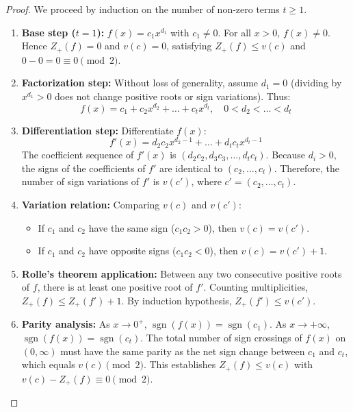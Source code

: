 \documentclass[11pt,a4paper]{article}
\theoremstyle{definition}
\begin{document}
\begin{proof}
We proceed by induction on the number of non-zero terms $t \ge 1$.
\begin{enumerate}
    \item \textbf{Base step ($t = 1$):} $f(x) = c_1 x^{d_1}$ with $c_1 \ne 0$. For all $x > 0$, $f(x) \ne 0$. Hence $Z_+(f) = 0$ and $v(c) = 0$, satisfying $Z_+(f) \le v(c)$ and $0 - 0 = 0 \equiv 0 \pmod 2$.
    
    \item \textbf{Factorization step:} Without loss of generality, assume $d_1 = 0$ (dividing by $x^{d_1} > 0$ does not change positive roots or sign variations). Thus:
    \[ f(x) = c_1 + c_2 x^{d_2} + \dots + c_t x^{d_t}, \quad 0 < d_2 < \dots < d_t \]
    
    \item \textbf{Differentiation step:} Differentiate $f(x)$:
    \[ f'(x) = d_2 c_2 x^{d_2 - 1} + \dots + d_t c_t x^{d_t - 1} \]
    The coefficient sequence of $f'(x)$ is $(d_2 c_2, d_3 c_3, \dots, d_t c_t)$. Because $d_i > 0$, the signs of the coefficients of $f'$ are identical to $(c_2, \dots, c_t)$.
    Therefore, the number of sign variations of $f'$ is $v(c')$, where $c' = (c_2, \dots, c_t)$.
    
    \item \textbf{Variation relation:} Comparing $v(c)$ and $v(c')$:
    \begin{itemize}
        \item If $c_1$ and $c_2$ have the same sign ($c_1 c_2 > 0$), then $v(c) = v(c')$.
        \item If $c_1$ and $c_2$ have opposite signs ($c_1 c_2 < 0$), then $v(c) = v(c') + 1$.
    \end{itemize}
    
    \item \textbf{Rolle's theorem application:} Between any two consecutive positive roots of $f$, there is at least one positive root of $f'$. Counting multiplicities, $Z_+(f) \le Z_+(f') + 1$.
    By induction hypothesis, $Z_+(f') \le v(c')$.
    
    \item \textbf{Parity analysis:} As $x \to 0^+$, $\operatorname{sgn}(f(x)) = \operatorname{sgn}(c_1)$. As $x \to +\infty$, $\operatorname{sgn}(f(x)) = \operatorname{sgn}(c_t)$.
    The total number of sign crossings of $f(x)$ on $(0, \infty)$ must have the same parity as the net sign change between $c_1$ and $c_t$, which equals $v(c) \pmod 2$.
    This establishes $Z_+(f) \le v(c)$ with $v(c) - Z_+(f) \equiv 0 \pmod 2$.
\end{enumerate}
\end{proof}
\end{document}
